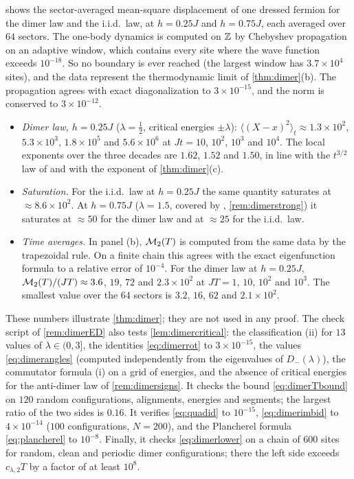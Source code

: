 \begin{remark}\label{rem:dimernumerics}
 shows the sector-averaged mean-square displacement of one dressed fermion for the
dimer law and the i.i.d.\ law, at $h=0.25J$ and $h=0.75J$, each averaged over $64$ sectors.  The
one-body dynamics is computed on $\mathbb{Z}$ by Chebyshev propagation on an adaptive window, which contains
every site where the wave function exceeds $10^{-18}$.  So no boundary is ever reached (the largest
window has $3.7\times10^4$ sites), and the data represent the thermodynamic limit of
\cref{thm:dimer}(b).  The propagation agrees with exact diagonalization to $3\times10^{-15}$, and the
norm is conserved to $3\times10^{-12}$.
\begin{itemize}
\item \emph{Dimer law, $h=0.25J$} ($\lambda=\frac12$, critical energies $\pm\lambda$):
$\langle(X-x)^2\rangle_t\approx1.3\times10^2$, $5.3\times10^3$, $1.8\times10^5$ and $5.6\times10^6$ at $Jt=10$,
$10^2$, $10^3$ and $10^4$.  The local exponents over the three decades are $1.62$, $1.52$ and $1.50$, in
line with the $t^{3/2}$ law of \cite{DWP1990} and with the exponent of \cref{thm:dimer}(c).
\item \emph{Saturation.}  For the i.i.d.\ law at $h=0.25J$ the same quantity saturates at
$\approx8.6\times10^2$.  At $h=0.75J$ ($\lambda=1.5$, covered by \cite[Thm.~2.3]{DeBievreGerminet2000},
\cref{rem:dimerstrong}) it saturates at $\approx50$ for the dimer law and at $\approx25$ for the i.i.d.\ law.
\item \emph{Time averages.}  In panel (b), $\mathcal{M}_2(T)$ is computed from the same data by the trapezoidal
rule.  On a finite chain this agrees with the exact eigenfunction formula to a relative error of
$10^{-4}$.  For the dimer law at $h=0.25J$, $\mathcal{M}_2(T)/(JT)\approx3.6$, $19$, $72$ and $2.3\times10^2$ at
$JT=1$, $10$, $10^2$ and $10^3$.  The smallest value over the $64$ sectors is $3.2$, $16$, $62$ and
$2.1\times10^2$.
\end{itemize}
These numbers illustrate \cref{thm:dimer}; they are not used in any proof.  The check script of
\cref{rem:dimerED} also tests \cref{lem:dimercritical}: the classification (ii) for $13$
values of $\lambda\in(0,3]$, the identities \eqref{eq:dimerrot} to $3\times10^{-15}$, the values
\eqref{eq:dimerangles} (computed independently from the eigenvalues of $D_-(\lambda)$), the commutator
formula (i) on a grid of energies, and the absence of critical energies for the anti-dimer law of
\cref{rem:dimersigns}.  It checks the bound \eqref{eq:dimerTbound} on $120$ random configurations,
alignments, energies and segments; the largest ratio of the two sides is $0.16$.  It verifies
\eqref{eq:quadid} to $10^{-15}$, \eqref{eq:dimerimbid} to $4\times10^{-14}$ ($100$ configurations,
$N=200$), and the Plancherel formula \eqref{eq:plancherel} to $10^{-8}$.  Finally, it checks
\eqref{eq:dimerlower} on a chain of $600$ sites for random, clean and periodic dimer configurations;
there the left side exceeds $c_{\lambda,2}T$ by a factor of at least $10^8$.
\end{remark}

